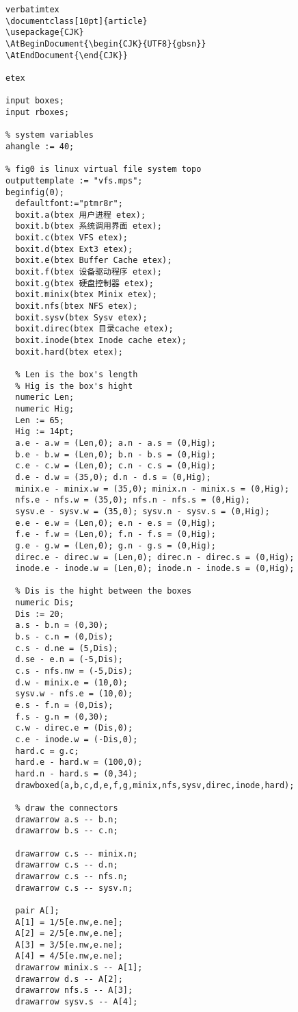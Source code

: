 \begin{verbatim}
verbatimtex
\documentclass[10pt]{article}
\usepackage{CJK}
\AtBeginDocument{\begin{CJK}{UTF8}{gbsn}}
\AtEndDocument{\end{CJK}}

etex
  
input boxes;
input rboxes;

% system variables
ahangle := 40;

% fig0 is linux virtual file system topo
outputtemplate := "vfs.mps";
beginfig(0);
  defaultfont:="ptmr8r";
  boxit.a(btex 用户进程 etex);
  boxit.b(btex 系统调用界面 etex);
  boxit.c(btex VFS etex);
  boxit.d(btex Ext3 etex);
  boxit.e(btex Buffer Cache etex);
  boxit.f(btex 设备驱动程序 etex);
  boxit.g(btex 硬盘控制器 etex);
  boxit.minix(btex Minix etex);
  boxit.nfs(btex NFS etex);
  boxit.sysv(btex Sysv etex);
  boxit.direc(btex 目录cache etex);
  boxit.inode(btex Inode cache etex);
  boxit.hard(btex etex);

  % Len is the box's length
  % Hig is the box's hight
  numeric Len;
  numeric Hig;
  Len := 65;
  Hig := 14pt;
  a.e - a.w = (Len,0); a.n - a.s = (0,Hig);
  b.e - b.w = (Len,0); b.n - b.s = (0,Hig);
  c.e - c.w = (Len,0); c.n - c.s = (0,Hig);
  d.e - d.w = (35,0); d.n - d.s = (0,Hig);
  minix.e - minix.w = (35,0); minix.n - minix.s = (0,Hig);
  nfs.e - nfs.w = (35,0); nfs.n - nfs.s = (0,Hig);
  sysv.e - sysv.w = (35,0); sysv.n - sysv.s = (0,Hig);
  e.e - e.w = (Len,0); e.n - e.s = (0,Hig);
  f.e - f.w = (Len,0); f.n - f.s = (0,Hig);
  g.e - g.w = (Len,0); g.n - g.s = (0,Hig);
  direc.e - direc.w = (Len,0); direc.n - direc.s = (0,Hig);
  inode.e - inode.w = (Len,0); inode.n - inode.s = (0,Hig);

  % Dis is the hight between the boxes
  numeric Dis;
  Dis := 20;
  a.s - b.n = (0,30);
  b.s - c.n = (0,Dis);
  c.s - d.ne = (5,Dis);
  d.se - e.n = (-5,Dis);
  c.s - nfs.nw = (-5,Dis);
  d.w - minix.e = (10,0);
  sysv.w - nfs.e = (10,0);
  e.s - f.n = (0,Dis);
  f.s - g.n = (0,30);
  c.w - direc.e = (Dis,0);
  c.e - inode.w = (-Dis,0);
  hard.c = g.c;
  hard.e - hard.w = (100,0);
  hard.n - hard.s = (0,34);
  drawboxed(a,b,c,d,e,f,g,minix,nfs,sysv,direc,inode,hard);

  % draw the connectors
  drawarrow a.s -- b.n;
  drawarrow b.s -- c.n;
  
  drawarrow c.s -- minix.n;
  drawarrow c.s -- d.n;
  drawarrow c.s -- nfs.n;
  drawarrow c.s -- sysv.n;

  pair A[];
  A[1] = 1/5[e.nw,e.ne];
  A[2] = 2/5[e.nw,e.ne];
  A[3] = 3/5[e.nw,e.ne];
  A[4] = 4/5[e.nw,e.ne];
  drawarrow minix.s -- A[1];
  drawarrow d.s -- A[2];
  drawarrow nfs.s -- A[3];
  drawarrow sysv.s -- A[4];


\end{verbatim}
